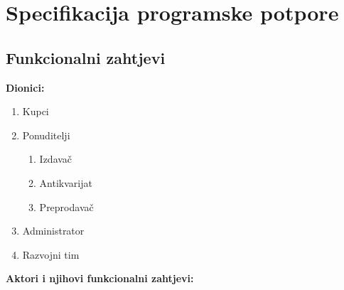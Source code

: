 \setcounter{chapter}{2}
\chapter{Specifikacija programske potpore}

\section{Funkcionalni zahtjevi}

\noindent \textbf{Dionici:}

\begin{enumerate}
	
	\item Kupci 
	\item Ponuditelji
	\begin{enumerate}
		\item Izdavač
		\item Antikvarijat
		\item Preprodavač
	\end{enumerate}	
	\item Administrator		
	\item Razvojni tim
	
\end{enumerate}

\noindent \textbf{Aktori i njihovi funkcionalni zahtjevi:}


